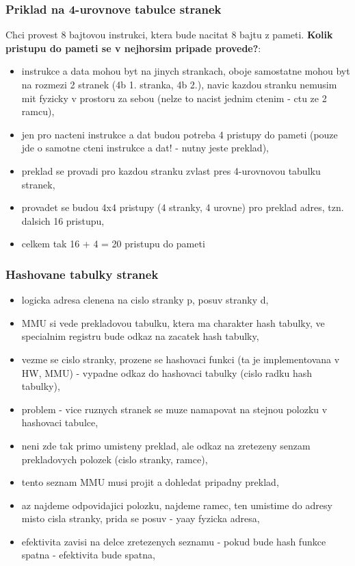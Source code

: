 \documentclass[a4paper, 11pt]{article}
\begin{document}
\subsubsection{Priklad na 4-urovnove tabulce stranek}
Chci provest 8 bajtovou instrukci, ktera bude nacitat 8 bajtu z pameti. \textbf{Kolik pristupu do pameti se v nejhorsim pripade provede?}:
\begin{itemize}
    \item instrukce a data mohou byt na jinych strankach, oboje samostatne mohou byt na rozmezi 2 stranek (4b 1. stranka, 4b 2.), navic kazdou stranku nemusim mit fyzicky v prostoru za sebou (nelze to nacist jednim ctenim - ctu ze 2 ramcu),
    \item jen pro nacteni instrukce a dat budou potreba 4 pristupy do pameti (pouze jde o samotne cteni instrukce a dat! - nutny jeste preklad),
    \item preklad se provadi pro kazdou stranku zvlast pres 4-urovnovou tabulku stranek,
    \item provadet se budou 4x4 pristupy (4 stranky, 4 urovne) pro preklad adres, tzn. dalsich 16 pristupu,
    \item celkem tak 16 + 4 = 20 pristupu do pameti \\
\end{itemize}

\newpage

\subsubsection{Hashovane tabulky stranek}
\begin{itemize}
    \item logicka adresa clenena na cislo stranky p, posuv stranky d,
    \item MMU si vede prekladovou tabulku, ktera ma charakter hash tabulky, ve specialnim registru bude odkaz na zacatek hash tabulky,
    \item vezme se cislo stranky, prozene se hashovaci funkci (ta je implementovana v HW, MMU) - vypadne odkaz do hashovaci tabulky (cislo radku hash tabulky),
    \item problem - vice ruznych stranek se muze namapovat na stejnou polozku v hashovaci tabulce,
    \item neni zde tak primo umisteny preklad, ale odkaz na zretezeny senzam prekladovych polozek (cislo stranky, ramce), 
    \item tento seznam MMU musi projit a dohledat pripadny preklad,
    \item az najdeme odpovidajici polozku, najdeme ramec, ten umistime do adresy misto cisla stranky, prida se posuv - yaay fyzicka adresa,
    \item efektivita zavisi na delce zretezenych seznamu - pokud bude hash funkce spatna - efektivita bude spatna, \\
\end{itemize}
\end{document}
